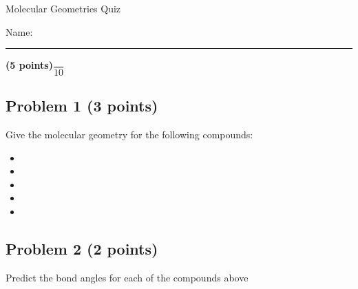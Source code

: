 \documentclass[12pt, letterpaper]{memoir}
\begin{document}
	\begin{center}
		{\large Molecular Geometries Quiz}
	\end{center}
	{\large Name: \rule[-1mm]{4in}{.1pt} {\bfseries (5 points)}\hspace{4em}$\dfrac{~}{10}$} 
	
	\subsection*{Problem 1 (3 points)}
	Give the molecular geometry for the following compounds:
	
	\begin{itemize}
		\item {}
		\item \vspace{3em} 
		\item \vspace{3em} 
		\item \vspace{3em} 
		\item \vspace{3em} 
	\end{itemize}

	\vspace{2.25em}
	\subsection*{Problem 2 (2 points)}
	Predict the bond angles for each of the compounds above
\end{document}
